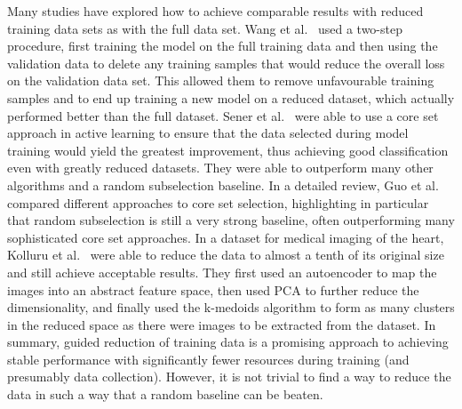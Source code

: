 Many studies have explored how to achieve comparable results with reduced training data sets as with the full data set. Wang et al.~\cite{wangDataDropoutOptimizing2018} used a two-step procedure, first training the model on the full training data and then using the validation data to delete any training samples that would reduce the overall loss on the validation data set. This allowed them to remove unfavourable training samples and to end up training a new model on a reduced dataset, which actually performed better than the full dataset. Sener et al.~\cite{senerActiveLearningConvolutional2018} were able to use a core set approach in active learning to ensure that the data selected during model training would yield the greatest improvement, thus achieving good classification even with greatly reduced datasets. They were able to outperform many other algorithms and a random subselection baseline. In a detailed review, Guo et al.~\cite{guoDeepCoreComprehensiveLibrary2022} compared different approaches to core set selection, highlighting in particular that random subselection is still a very strong baseline, often outperforming many sophisticated core set approaches. In a dataset for medical imaging of the heart, Kolluru et al.~\cite{kolluruLearningFewerImages2021} were able to reduce the data to almost a tenth of its original size and still achieve acceptable results. They first used an autoencoder to map the images into an abstract feature space, then used PCA to further reduce the dimensionality, and finally used the k-medoids algorithm to form as many clusters in the reduced space as there were images to be extracted from the dataset. In summary, guided reduction of training data is a promising approach to achieving stable performance with significantly fewer resources during training (and presumably data collection). However, it is not trivial to find a way to reduce the data in such a way that a random baseline can be beaten.



